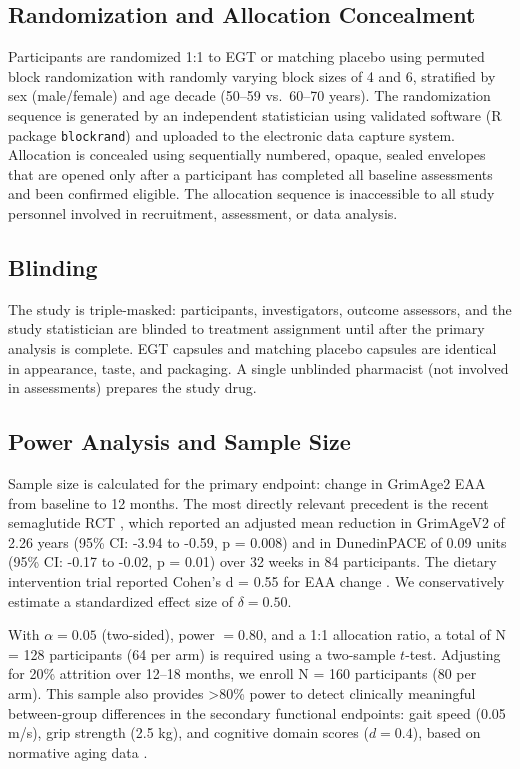 \documentclass[11pt,a4paper]{article}
\begin{document}
\subsection{Randomization and Allocation Concealment}

Participants are randomized 1:1 to EGT or matching placebo using permuted block randomization with randomly varying block sizes of 4 and 6, stratified by sex (male/female) and age decade (50--59 vs.~60--70 years). The randomization sequence is generated by an independent statistician using validated software (R package \texttt{blockrand}) and uploaded to the electronic data capture system. Allocation is concealed using sequentially numbered, opaque, sealed envelopes that are opened only after a participant has completed all baseline assessments and been confirmed eligible. The allocation sequence is inaccessible to all study personnel involved in recruitment, assessment, or data analysis.

\subsection{Blinding}

The study is triple-masked: participants, investigators, outcome assessors, and the study statistician are blinded to treatment assignment until after the primary analysis is complete. EGT capsules and matching placebo capsules are identical in appearance, taste, and packaging. A single unblinded pharmacist (not involved in assessments) prepares the study drug.

\subsection{Power Analysis and Sample Size}

Sample size is calculated for the primary endpoint: change in GrimAge2 EAA from baseline to 12 months. The most directly relevant precedent is the recent semaglutide RCT \cite{corley2025}, which reported an adjusted mean reduction in GrimAgeV2 of 2.26 years (95\% CI: -3.94 to -0.59, p = 0.008) and in DunedinPACE of 0.09 units (95\% CI: -0.17 to -0.02, p = 0.01) over 32 weeks in 84 participants. The dietary intervention trial reported Cohen's d = 0.55 for EAA change \cite{kou2025}. We conservatively estimate a standardized effect size of $\delta = 0.50$.

With $\alpha = 0.05$ (two-sided), power $= 0.80$, and a 1:1 allocation ratio, a total of N = 128 participants (64 per arm) is required using a two-sample $t$-test. Adjusting for 20\% attrition over 12--18 months, we enroll N = 160 participants (80 per arm). This sample also provides >80\% power to detect clinically meaningful between-group differences in the secondary functional endpoints: gait speed (0.05 m/s), grip strength (2.5 kg), and cognitive domain scores ($d = 0.4$), based on normative aging data \cite{studenski2003, bohannon2012}.
\end{document}
